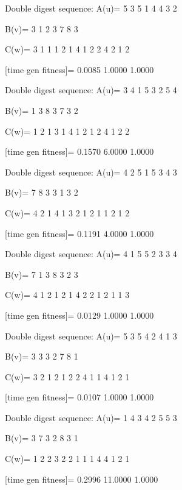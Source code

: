 Double digest sequence:
A(u)=
     5     3     5     1     4     4     3     2

B(v)=
     3     1     2     3     7     8     3

C(w)=
     3     1     1     1     2     1     4     1     2     2     4     2     1     2

[time gen fitness]=
    0.0085    1.0000    1.0000

Double digest sequence:
A(u)=
     3     4     1     5     3     2     5     4

B(v)=
     1     3     8     3     7     3     2

C(w)=
     1     2     1     3     1     4     1     2     1     2     4     1     2     2

[time gen fitness]=
    0.1570    6.0000    1.0000

Double digest sequence:
A(u)=
     4     2     5     1     5     3     4     3

B(v)=
     7     8     3     3     1     3     2

C(w)=
     4     2     1     4     1     3     2     1     2     1     1     2     1     2

[time gen fitness]=
    0.1191    4.0000    1.0000

Double digest sequence:
A(u)=
     4     1     5     5     2     3     3     4

B(v)=
     7     1     3     8     3     2     3

C(w)=
     4     1     2     1     2     1     4     2     2     1     2     1     1     3

[time gen fitness]=
    0.0129    1.0000    1.0000

Double digest sequence:
A(u)=
     5     3     5     4     2     4     1     3

B(v)=
     3     3     3     2     7     8     1

C(w)=
     3     2     1     2     1     2     2     4     1     1     4     1     2     1

[time gen fitness]=
    0.0107    1.0000    1.0000

Double digest sequence:
A(u)=
     1     4     3     4     2     5     5     3

B(v)=
     3     7     3     2     8     3     1

C(w)=
     1     2     2     3     2     2     1     1     1     4     4     1     2     1

[time gen fitness]=
    0.2996   11.0000    1.0000

